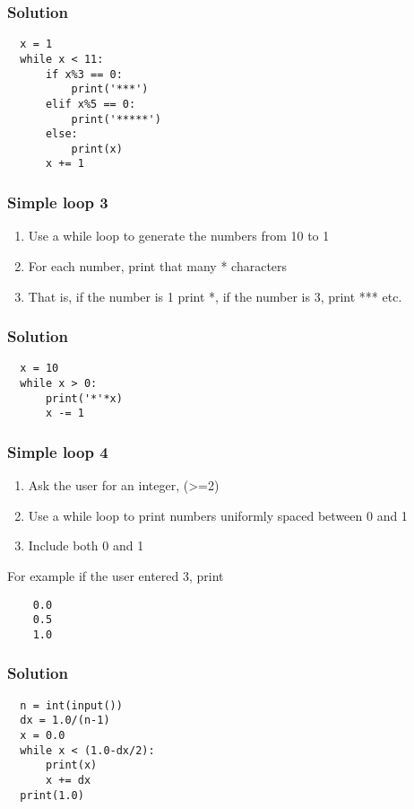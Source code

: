 \documentclass[14pt,compress]{beamer}
\begin{document}
\begin{frame}
\frametitle{Solution}
\begin{lstlisting}
  x = 1
  while x < 11:
      if x%3 == 0:
          print('***')
      elif x%5 == 0:
          print('*****')
      else:
          print(x)
      x += 1
\end{lstlisting}
\end{frame}

\begin{frame}[plain]
  \frametitle{Simple  loop 3}
  \begin{enumerate}
  \item Use a while loop to generate the numbers from 10 to 1
  \item For each number, print that many * characters
  \item That is, if the number is 1 print *, if the number is 3, print *** etc.
  \end{enumerate}
\end{frame}

\begin{frame}
\frametitle{Solution}
\begin{lstlisting}
  x = 10
  while x > 0:
      print('*'*x)
      x -= 1
\end{lstlisting}
\end{frame}

\begin{frame}
  \frametitle{Simple  loop 4}
  \begin{enumerate}
  \item Ask the user for an integer,  (>=2)
  \item Use a while loop to print  numbers uniformly spaced between 0 and 1
  \item Include both 0 and 1
  \end{enumerate}
  For example if the user entered 3, print
  \begin{lstlisting}
    0.0
    0.5
    1.0
  \end{lstlisting}

\end{frame}

\begin{frame}
\frametitle{Solution}
\begin{lstlisting}
  n = int(input())
  dx = 1.0/(n-1)
  x = 0.0
  while x < (1.0-dx/2):
      print(x)
      x += dx
  print(1.0)
\end{lstlisting}
\end{frame}
\end{document}
